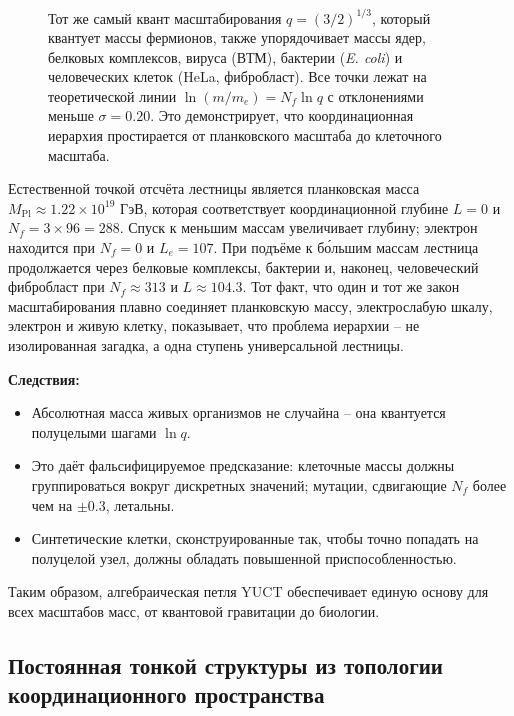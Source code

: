 \documentclass[11pt,a4paper]{article}
\begin{document}
\begin{figure}[htbp]
		\caption{Тот же самый квант масштабирования \(q = (3/2)^{1/3}\), который квантует массы фермионов, также упорядочивает массы ядер, белковых комплексов, вируса (ВТМ), бактерии (\textit{E. coli}) и человеческих клеток (HeLa, фибробласт). Все точки лежат на теоретической линии \(\ln(m/m_e) = N_f \ln q\) с отклонениями меньше \(\sigma = 0.20\). Это демонстрирует, что координационная иерархия простирается от планковского масштаба до клеточного масштаба.}
		\label{fig:full_ladder}
	\end{figure}
	
	Естественной точкой отсчёта лестницы является планковская масса \(M_{\mathrm{Pl}} \approx 1.22 \times 10^{19}\) ГэВ, которая соответствует координационной глубине \(L = 0\) и \(N_f = 3 \times 96 = 288\). Спуск к меньшим массам увеличивает глубину; электрон находится при \(N_f = 0\) и \(L_e = 107\). При подъёме к б\'{о}льшим массам лестница продолжается через белковые комплексы, бактерии и, наконец, человеческий фибробласт при \(N_f \approx 313\) и \(L \approx 104.3\). Тот факт, что один и тот же закон масштабирования плавно соединяет планковскую массу, электрослабую шкалу, электрон и живую клетку, показывает, что проблема иерархии – не изолированная загадка, а одна ступень универсальной лестницы.
	
	\textbf{Следствия:}
	\begin{itemize}
		\item Абсолютная масса живых организмов не случайна – она квантуется полуцелыми шагами \(\ln q\).
		\item Это даёт фальсифицируемое предсказание: клеточные массы должны группироваться вокруг дискретных значений; мутации, сдвигающие \(N_f\) более чем на \(\pm0.3\), летальны.
		\item Синтетические клетки, сконструированные так, чтобы точно попадать на полуцелой узел, должны обладать повышенной приспособленностью.
	\end{itemize}
	
	Таким образом, алгебраическая петля YUCT обеспечивает единую основу для всех масштабов масс, от квантовой гравитации до биологии.
	
	\subsection{Постоянная тонкой структуры из топологии координационного пространства}
	\label{subsec:alpha-topology}
	
\end{document}
